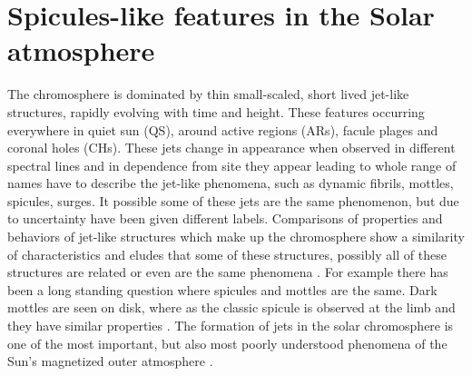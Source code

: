 \documentclass[12pt]{ociamthesis}
\begin{document}
\section{Spicules-like features in the Solar atmosphere}
\label{sec:spic_atmos}
The chromosphere is dominated by thin small-scaled, short lived  jet-like structures, rapidly evolving with time and height. These features occurring everywhere in quiet sun (QS), around active regions (ARs), facule plages and coronal holes (CHs). These jets change in appearance when observed in different spectral lines and in dependence from site they appear leading to whole range of names have to describe the jet-like phenomena, such as dynamic fibrils, mottles, spicules, surges. It possible some of these jets are the same phenomenon, but due to uncertainty have been given different labels. Comparisons of properties and behaviors of jet-like structures which make up the chromosphere show a similarity of characteristics and eludes that some of these structures, possibly all of these structures are related or even are the same phenomena \cite{Porfir2016A}. For example there has been a long standing question where spicules and mottles are the same. Dark mottles are seen on disk, where as the classic spicule is observed at the limb and they have similar properties \cite{Pontieu2007ASPC}. The formation of jets in the solar chromosphere is one of the most important, but also most poorly understood phenomena of the Sun's magnetized outer atmosphere \citep{Hansteen2006ApJ}. 
\end{document}

